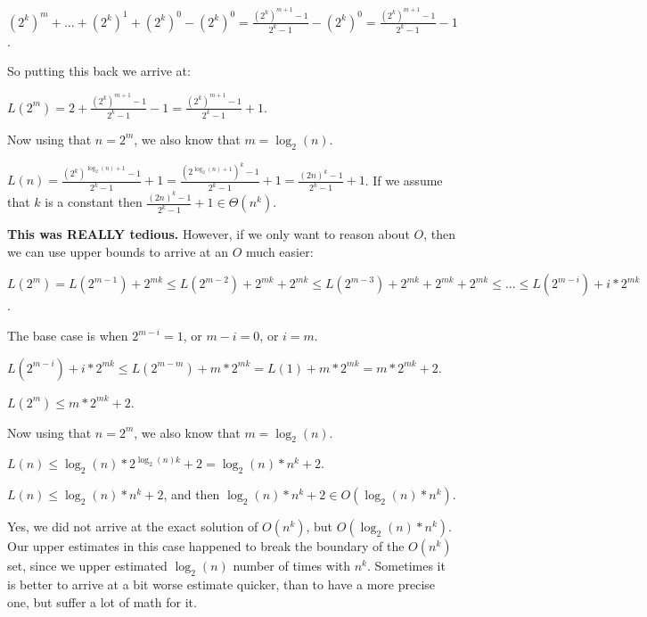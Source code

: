 $(2^k)^m+...+(2^k)^1+(2^k)^0-(2^k)^0 = \frac{(2^k)^{m+1}-1}{2^k-1}-(2^k)^0 =\frac{(2^k)^{m+1}-1}{2^k-1}-1$.

So putting this back we arrive at:

$L(2^m) = 2+\frac{(2^k)^{m+1}-1}{2^k-1}-1 = \frac{(2^k)^{m+1}-1}{2^k-1} + 1$.

Now using that $n=2^m$, we also know that $m=\log_2(n)$.

$L(n) = \frac{(2^k)^{\log_2(n)+1}-1}{2^k-1} + 1 = \frac{(2^{\log_2(n)+1})^k-1}{2^k-1} + 1 = \frac{(2n)^k-1}{2^k-1} + 1$. If we assume that $k$ is a constant then $\frac{(2n)^k-1}{2^k-1} + 1 \in{} \Theta(n^k)$.

\textbf{This was REALLY tedious.} However, if we only want to reason about $O$, then we can use upper bounds to arrive at an $O$ much easier:

$L(2^m) = L(2^{m-1}) + 2^{mk} \leq{} L(2^{m-2}) + 2^{mk} + 2^{mk} \leq{} L(2^{m-3}) + 2^{mk} + 2^{mk} + 2^{mk} \leq{} ... \leq{} L(2^{m-i}) + i*2^{mk}$.

The base case is when $2^{m-i}=1$, or $m-i=0$, or $i=m$.

$ L(2^{m-i}) + i*2^{mk} \leq{} L(2^{m-m}) + m*2^{mk} = L(1) + m*2^{mk} = m*2^{mk} + 2$.

$L(2^m) \leq{} m*2^{mk} + 2$.

Now using that $n=2^m$, we also know that $m=\log_2(n)$.

$L(n) \leq{} \log_2(n)*2^{\log_2(n)k} + 2 = \log_2(n)*n^k + 2$.

$L(n) \leq{} \log_2(n)*n^k + 2$, and then $\log_2(n)*n^k + 2 \in{} O(\log_2(n)*n^k)$.

Yes, we did not arrive at the exact solution of $O(n^k)$, but $O(\log_2(n)*n^k)$. Our upper estimates in this case happened to break the boundary of the $O(n^k)$ set, since we upper estimated $\log_2(n)$ number of times with $n^k$. Sometimes it is better to arrive at a bit worse estimate quicker, than to have a more precise one, but suffer a lot of math for it.